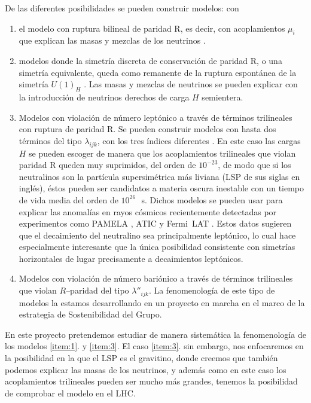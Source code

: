 De las diferentes posibilidades se pueden construir modelos: con 
\begin{enumerate}
\item el modelo con ruptura bilineal de paridad R, es decir, con
  acoplamientos $\mu_i$ que explican las masas y mezclas de los
  neutrinos \cite{Mira:2000gg,Dreiner:2003hw,Dreiner:2006xw}.
\label{item:1}
\item modelos donde la simetría discreta de conservación de
  paridad R, o una simetría equivalente, queda como remanente de la
  ruptura espontánea de la simetría $U(1)_H$
  \cite{Dreiner:2003hw,Dreiner:2003yr,Dreiner:2007vp}. Las masas y
  mezclas de neutrinos se pueden explicar con la introducción de
  neutrinos derechos de carga $H$ semientera.
\label{item:2}
\item Modelos con violación de número leptónico a través de términos
  trilineales con ruptura de paridad R. Se pueden construir modelos
  con hasta dos términos del tipo $\lambda_{ijk}$, con los tres
  índices diferentes \cite{Sierra:2009zq}.  En este caso las cargas
  $H$ se pueden escoger de manera que los acoplamientos trilineales
  que violan paridad R queden muy suprimidos, del orden de $10^{-23}$,
  de modo que si los neutralinos son la partícula supersimétrica más
  liviana (LSP de sus siglas en inglés), éstos pueden ser candidatos a
  materia oscura inestable con un tiempo de vida media del orden de
  $10^{26}\,$~s. Dichos modelos se pueden usar para explicar las
  anomalías en rayos cósmicos \cite{Sierra:2009zq} recientemente
  detectadas por experimentos como PAMELA \cite{Adriani:2008zr}, ATIC
  \cite{:2008zzr} y Fermi~LAT \cite{Abdo:2009zk}. Estos datos sugieren
  que el decaimiento del neutralino sea principalmente leptónico, lo
  cual hace especialmente interesante que la única posibilidad
  consistente con simetrías horizontales de lugar precisamente a
  decaimientos leptónicos.
\label{item:3}
\item Modelos con violación de número bariónico a través de términos
  trilineales que violan $R$--paridad del tipo $\lambda''_{ijk}$. La
  fenomenología de este tipo de modelos la estamos desarrollando en un
  proyecto en marcha en el marco de la estrategia de Sostenibilidad
  del Grupo.
\label{item:4}
\end{enumerate}
En este proyecto pretendemos estudiar de manera sistemática la
fenomenología de los modelos \ref{item:1}. y \ref{item:3}. El caso
\ref{item:3}. sin embargo, nos enfocaremos en la posibilidad en la que
el LSP es el gravitino, donde creemos que también podemos explicar las
masas de los neutrinos, y además como en este caso los acoplamientos
trilineales pueden ser mucho más grandes, tenemos la posibilidad de
comprobar el modelo en el LHC.

